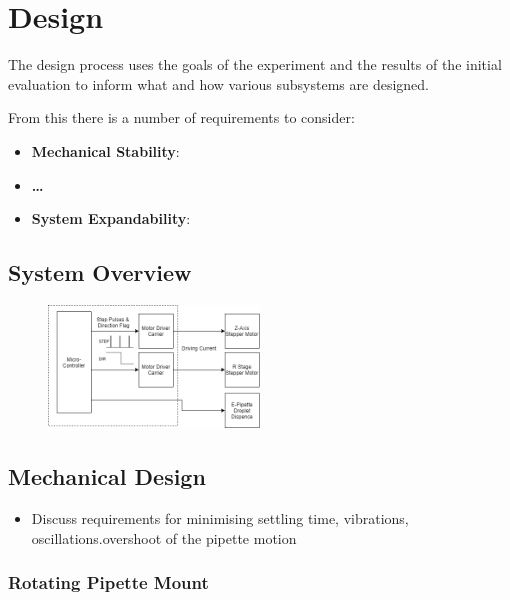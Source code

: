 \chapter{Design}\label{C:design}

The design process uses the goals of the experiment and the results of the initial evaluation to inform what and how various subsystems are designed.

From this there is a number of requirements to consider:

\begin{itemize}
    \item \textbf{Mechanical Stability}:
    \item \textbf{\dots}
    \item \textbf{System Expandability}:
\end{itemize}

\section{System Overview}

\begin{figure}[h]
    \begin{center}
        \includegraphics[width=0.5\textwidth]{img/ED_block_diag.png}
    \end{center}
\end{figure}

\section{Mechanical Design}

\begin{itemize}
    \item Discuss requirements for minimising settling time, vibrations, oscillations.overshoot of the pipette motion 
\end{itemize}

\subsection{Rotating Pipette Mount}

